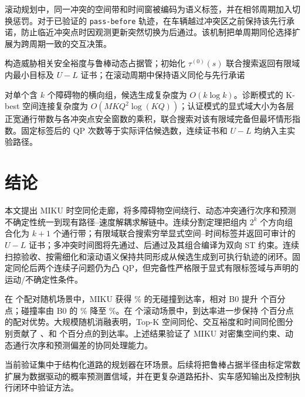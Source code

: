 滚动规划中，同一冲突的空间带和时间窗被编码为语义标签，并在相邻周期加入切换惩罚。对于已验证的 \texttt{pass-before} 轨迹，在车辆越过冲突区之前保持该先行承诺，防止临近冲突点时因观测更新突然切换为后通过。该机制把单周期同伦选择扩展为跨周期一致的交互决策。

\begin{algorithm}[htbp]
\small
\caption{MIKU 时空同伦走廊规划}
\label{alg:miku}
构造威胁相关安全裕度与鲁棒动态占据管；初始化 $\tau^{(0)}(s)$\;
联合搜索返回有限域内最小目标及 $U-L$ 证书；在滚动周期中保持语义同伦与先行承诺\;
\end{algorithm}

对单个含 $k$ 个障碍物的横向组，候选生成复杂度为 $O(k\log k)$。诊断模式的 K-best 空间连接复杂度为 $O(MKQ^2\log(KQ))$；认证模式的显式域大小为各层正宽通行带数与各冲突点安全窗数的乘积，联合搜索对该有限域完备但最坏情形指数。固定标签后的 QP 次数等于实际评估候选数，连续证书和 $U-L$ 均纳入主实验路径。



\section{结论}
\label{sec:conclusion}

本文提出 MIKU 时空同伦走廊，将多障碍物空间绕行、动态冲突通行次序和预测不确定性统一到现有路径--速度解耦求解链中。连续分割定理把组内 $2^k$ 个方向组合化为 $k+1$ 个通行带；有限域联合搜索穷举显式空间--时间标签并返回可审计的 $U-L$ 证书；多冲突时间图将先通过、后通过及其组合编译为双向 ST 约束。连续扫掠验收、按需细化和滚动语义保持共同形成从候选生成到可执行轨迹的闭环。固定同伦后两个连续子问题仍为凸 QP，但完备性严格限于显式有限标签域与声明的运动/不确定性条件。

在 \RandCaseCount 个配对随机场景中，MIKU 获得 \RandAllMikuSuccessPct\% 的无碰撞到达率，相对 B0 提升 \RandAllMikuVsBZeroSuccessDiff 个百分点；碰撞率由 B0 的 \RandAllBZeroCollisionPct\% 降至 \RandAllMikuCollisionPct\%。在 \ClosedCaseCount 个滚动场景中，到达率进一步保持 \ClosedMikuVsBZeroSuccessDiff 个百分点的配对优势。大规模随机消融表明，Top-K 空间同伦、交互裕度和时间同伦图分别贡献了 \AblMikuVsAThreeSuccessDiff、\AblMikuVsAFourSuccessDiff 和 \AblMikuVsAFiveSuccessDiff 个百分点的到达率。上述结果验证了 MIKU 对密集空间约束、动态通行次序和预测偏差的协同处理能力。

当前验证集中于结构化道路的规划器在环场景。后续将把鲁棒占据半径由标定常数扩展为数据驱动的概率预测置信域，并在更复杂道路拓扑、实车感知输出及控制执行闭环中验证方法。
